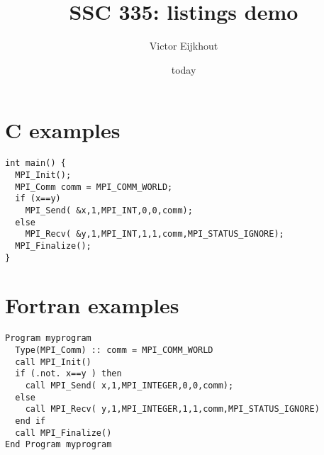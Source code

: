 \documentclass{article}
\begin{document}
\title{SSC 335: listings demo}
\author{Victor Eijkhout}
\date{today}
\maketitle

\section{C examples}

\lstset{language=C}
\begin{lstlisting}
int main() {
  MPI_Init();
  MPI_Comm comm = MPI_COMM_WORLD;
  if (x==y) 
    MPI_Send( &x,1,MPI_INT,0,0,comm);
  else
    MPI_Recv( &y,1,MPI_INT,1,1,comm,MPI_STATUS_IGNORE);
  MPI_Finalize();
}
\end{lstlisting}

\section{Fortran examples}

\lstset{language=Fortran}
\begin{lstlisting}
Program myprogram
  Type(MPI_Comm) :: comm = MPI_COMM_WORLD
  call MPI_Init()
  if (.not. x==y ) then
    call MPI_Send( x,1,MPI_INTEGER,0,0,comm);
  else
    call MPI_Recv( y,1,MPI_INTEGER,1,1,comm,MPI_STATUS_IGNORE)
  end if
  call MPI_Finalize()
End Program myprogram
\end{lstlisting}
\end{document}
